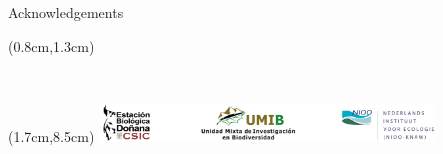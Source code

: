 \documentclass[compress]{beamer}
\begin{document}
\begin{frame}{Acknowledgements}
 \vspace{7pt}


\begin{textblock*}{8cm}(0.8cm,1.3cm)
\end{textblock*}
\\

\begin{textblock*}{8cm}(1.7cm,8.5cm)
\includegraphics[height = 1cm]{Image/Illustration/friselab2.png} \end{textblock*}

\end{frame}
\end{document}
